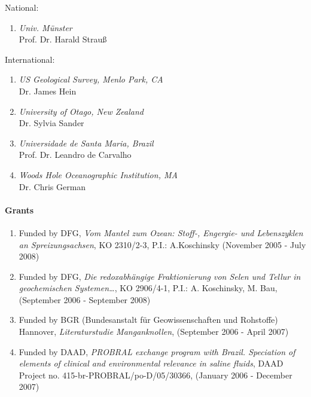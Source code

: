 National:
\begin{enumerate}
\item {\sl Univ. M\"unster} \\ Prof. Dr. Harald Strau\ss
\end{enumerate}

International:
\begin{enumerate}
\item {\sl US Geological Survey, Menlo Park, CA}\\ Dr. James Hein
\item {\sl University of Otago, New Zealand}\\ Dr. Sylvia Sander
\item {\sl Universidade de Santa Maria, Brazil} \\ Prof. Dr. Leandro
de Carvalho
\item {\sl Woods Hole Oceanographic Institution, MA}\\ Dr. Chris
German
\end{enumerate}


\paragraph{Grants}
\begin{enumerate}
\item
Funded by DFG, \emph{Vom Mantel zum Ozean: Stoff-, Engergie- und Lebenszyklen an
  Spreizungsachsen},  KO 2310/2-3,  P.I.: {A.Koschinsky} (November 2005 - July 2008)

\item
Funded by DFG, \emph{Die redoxabh\"angige Fraktionierung von Selen und Tellur in
  geochemischen Systemen\dots}, KO 2906/4-1, P.I.: {A. Koschinsky, } M. Bau, (September
2006 - September 2008)
 
\item
Funded by BGR (Bundesanstalt f\"ur Geowissenschaften und Rohstoffe) Hannover,
\emph{Literaturstudie Manganknollen}, (September 2006 - April 2007)

\item
Funded by DAAD, \emph{PROBRAL exchange program with Brazil. Speciation of
elements of clinical and environmental relevance in saline fluids}, DAAD Project
no. 415-br-PROBRAL/po-D/05/30366, (January 2006 - December 2007)

%
\end{enumerate}
